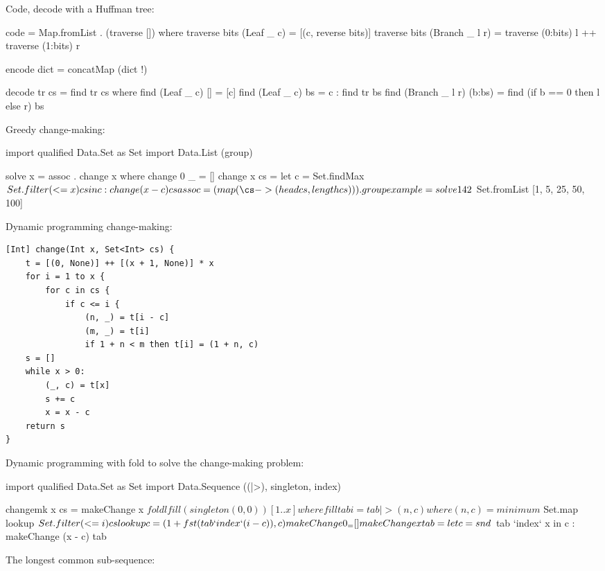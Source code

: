 \documentclass[b5paper]{article}
\begin{document}
Code, decode with a Huffman tree:

\begin{Haskell}
code = Map.fromList . (traverse []) where
  traverse bits (Leaf _ c) = [(c, reverse bits)]
  traverse bits (Branch _ l r) = traverse (0:bits) l ++ traverse (1:bits) r

encode dict = concatMap (dict !)

decode tr cs = find tr cs where
  find (Leaf _ c) [] = [c]
  find (Leaf _ c) bs = c : find tr bs
  find (Branch _ l r) (b:bs) = find (if b == 0 then l else r) bs
\end{Haskell} %

Greedy change-making:

\begin{Haskell}
import qualified Data.Set as Set
import Data.List (group)

solve x = assoc . change x where
  change 0 _ = []
  change x cs = let c = Set.findMax $ Set.filter (<= x) cs in c : change (x - c) cs
  assoc = (map (\cs -> (head cs, length cs))) . group

example = solve 142 $ Set.fromList [1, 5, 25, 50, 100]
\end{Haskell} %

Dynamic programming change-making:

\begin{lstlisting}[language = Bourbaki]
[Int] change(Int x, Set<Int> cs) {
    t = [(0, None)] ++ [(x + 1, None)] * x
    for i = 1 to x {
        for c in cs {
            if c <= i {
                (n, _) = t[i - c]
                (m, _) = t[i]
                if 1 + n < m then t[i] = (1 + n, c)
    s = []
    while x > 0:
        (_, c) = t[x]
        s += c
        x = x - c
    return s
}
\end{lstlisting}

Dynamic programming with fold to solve the change-making problem:

\begin{Haskell}
import qualified Data.Set as Set
import Data.Sequence ((|>), singleton, index)

changemk x cs = makeChange x $ foldl fill (singleton (0, 0)) [1..x] where
  fill tab i = tab |> (n, c) where
    (n, c) = minimum $ Set.map lookup $ Set.filter (<= i) cs
    lookup c  = (1 + fst (tab `index` (i - c)), c)
  makeChange 0 _ = []
  makeChange x tab = let c = snd $ tab `index` x in c : makeChange (x - c) tab
\end{Haskell} %

The longest common sub-sequence:
\end{document}

